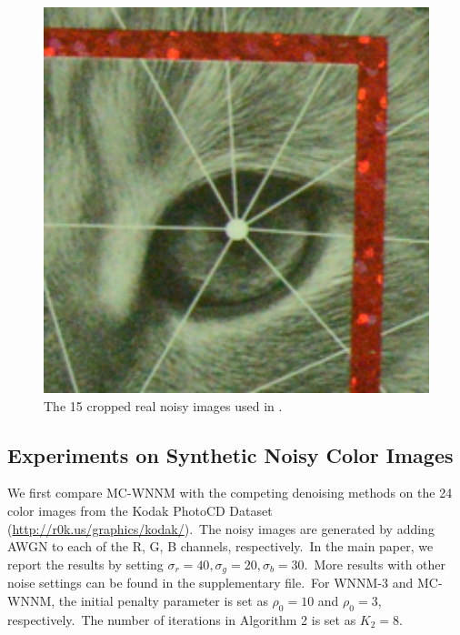 \documentclass[10pt,twocolumn,letterpaper]{article}
\begin{document}
\begin{figure}
{\begin{minipage}{0.08\textwidth}
\end{minipage}
\begin{minipage}{0.08\textwidth}
\includegraphics[width=1\textwidth]{CC15images/resize_d800_iso6400_3_real.png}
\end{minipage}
}\vspace{-1mm}
\caption{The 15 cropped real noisy images used in \cite{crosschannel2016}.}
\label{f2}
\vspace{-5mm}
\end{figure}

\vspace{-1mm}
\subsection{Experiments on Synthetic Noisy Color Images}
\vspace{-1mm}

We first compare MC-WNNM with the competing denoising methods \cite{cbm3d,mlp,chen2015learning,dncnn,noiseclinic,neatimage} on the 24 color images from the Kodak PhotoCD Dataset (\url{http://r0k.us/graphics/kodak/}).\ The noisy images are generated by adding AWGN to each of the R, G, B channels, respectively.\ In the main paper, we report the results by setting $\sigma_{r}=40, \sigma_{g}=20, \sigma_{b}=30$.\ More results with other noise settings can be found in the supplementary file.\ For WNNM-3 and MC-WNNM, the initial penalty parameter is set as $\rho_{0}=10$ and $\rho_{0}=3$, respectively.\ The number of iterations in Algorithm 2 is set as $K_{2}=8$. 
\end{document}
